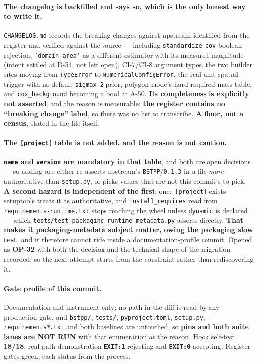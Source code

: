 \documentclass[
  10pt,
]{article}
\begin{document}
\paragraph{The changelog is backfilled and says so, which is the only honest way to write it.}
\texttt{CHANGELOG.md} records the breaking changes against upstream identified
from the register and verified against the source --- including
\texttt{standardize\_cov} boolean rejection, \texttt{'domain\_area'} as a
different estimator with its measured magnitude (intent settled at D-54, not
left open), CI-7/CI-8 argument types, the two builder sites moving from
\texttt{TypeError} to \texttt{NumericalConfigError}, the real-unit spatial
trigger with no default \texttt{sigmax\_2} prior, polygon mode's hard-required
mass table, and \texttt{cox\_background} becoming a bool at A-50.
\textbf{Its completeness is explicitly not asserted}, and the reason is
measurable: \textbf{the register contains no ``breaking change'' label}, so
there was no list to transcribe. \textbf{A floor, not a census}, stated in the
file itself.

\paragraph{The \texttt{[project]} table is not added, and the reason is not caution.}
\textbf{\texttt{name} and \texttt{version} are mandatory in that table}, and
both are open decisions --- so adding one either re-asserts upstream's
\texttt{BSTPP}/\texttt{0.1.3} in a file \emph{more} authoritative than
\texttt{setup.py}, or picks values that are not this commit's to pick.
\textbf{A second hazard is independent of the first}: once \texttt{[project]}
exists setuptools treats it as authoritative, and \texttt{install\_requires}
read from \texttt{requirements-runtime.txt} stops reaching the wheel unless
\texttt{dynamic} is declared --- which
\texttt{tests/test\_packaging\_runtime\_metadata.py} asserts directly.
\textbf{That makes it packaging-metadata subject matter, owing the packaging
slow test}, and it therefore cannot ride inside a documentation-profile commit.
Opened as \textbf{OP-32} with both the decision and the technical shape of the
migration recorded, so the next attempt starts from the constraint rather than
rediscovering it.

\paragraph{Gate profile of this commit.}
Documentation and instrument only; no path in the diff is read by any production
gate, and \texttt{bstpp/}, \texttt{tests/}, \texttt{pyproject.toml},
\texttt{setup.py}, \texttt{requirements*.txt} and both baselines are untouched,
so \textbf{pins and both suite lanes are NOT RUN} with that enumeration as the
reason. Hook self-test \textbf{18/18}; real-path demonstration
\textbf{\texttt{EXIT:1}} rejecting and \textbf{\texttt{EXIT:0}} accepting.
Register gates green, each status from the process.
\end{document}
